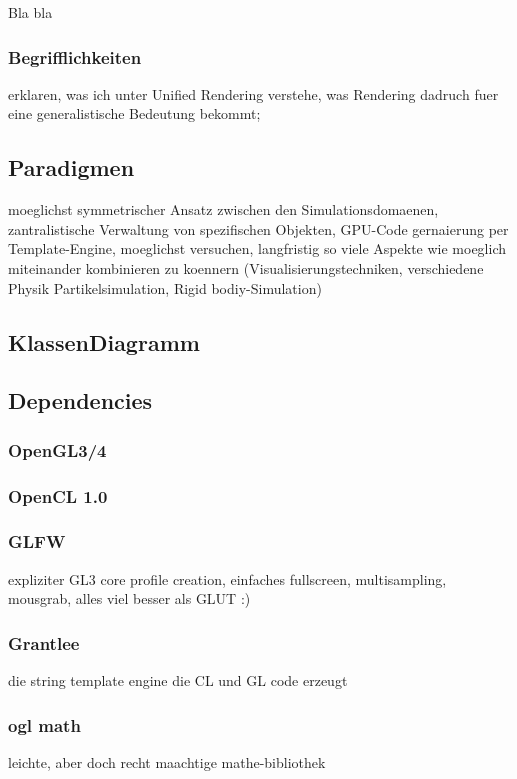 Bla bla

\subsubsection{Begrifflichkeiten}
	erklaren, was ich unter Unified Rendering verstehe, was Rendering dadruch fuer eine generalistische Bedeutung bekommt;

\subsection{Paradigmen}
	
	moeglichst symmetrischer Ansatz zwischen den Simulationsdomaenen, zantralistische Verwaltung von spezifischen Objekten,
	GPU-Code gernaierung per Template-Engine, moeglichst versuchen, langfristig so viele Aspekte wie moeglich miteinander kombinieren zu koennern 	    
	(Visualisierungstechniken, verschiedene Physik Partikelsimulation, Rigid bodiy-Simulation) 

\subsection{KlassenDiagramm}

\subsection{Dependencies}

	
	\subsubsection{OpenGL3/4}
    \subsubsection{OpenCL 1.0}
    \subsubsection{GLFW}
    	expliziter GL3 core profile creation, einfaches fullscreen, multisampling, mousgrab, alles viel besser als GLUT :)
    \subsubsection{Grantlee}
       die string template engine die CL und GL code erzeugt
    \subsubsection{ogl math}
    	leichte, aber doch recht maachtige mathe-bibliothek
    	
